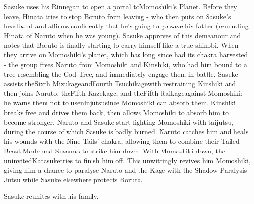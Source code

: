 \documentclass[a4paper,12pt]{article}
\begin{document}
Sasuke uses his Rinnegan to open a portal toMomoshiki's Planet. Before they leave, Hinata tries to stop Boruto from leaving - who then puts on Sasuke's headband and affirms confidently that he's going to go save his father (reminding Hinata of Naruto when he was young). Sasuke approves of this demeanour and notes that Boruto is finally starting to carry himself like a true shinobi. When they arrive on Momoshiki's planet, which has long since had its chakra harvested - the group frees Naruto from Momoshiki and Kinshiki, who had him bound to a tree resembling the God Tree, and immediately engage them in battle. Sasuke assists theSixth MizukageandFourth Tsuchikagewith restraining Kinshiki and then joins Naruto, theFifth Kazekage, and theFifth Raikageagainst Momoshiki; he warns them not to useninjutsusince Momoshiki can absorb them. Kinshiki breaks free and drives them back, then allows Momoshiki to absorb him to become stronger. Naruto and Sasuke start fighting Momoshiki with taijutsu, during the course of which Sasuke is badly burned. Naruto catches him and heals his wounds with the Nine-Tails' chakra, allowing them to combine their Tailed Beast Mode and Susanoo to strike him down. With Momoshiki down, the uninvitedKatasuketries to finish him off. This unwittingly revives him Momoshiki, giving him a chance to paralyse Naruto and the Kage with the Shadow Paralysis Jutsu while Sasuke elsewhere protects Boruto.\\ \par \vspace{0.5cm}

Sasuke reunites with his family.\\ \par \vspace{0.5cm}
\end{document}
